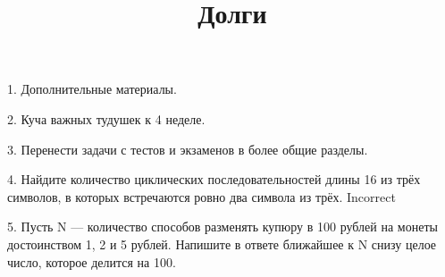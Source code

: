 \documentclass[paper=a4, fontsize=11pt]{scrartcl}
\title{
        \huge Долги \\
}
\date{}
\author{}
\begin{document}
\maketitle

1. Дополнительные материалы.

2. Куча важных тудушек к 4 неделе.

3. Перенести задачи с тестов и экзаменов в более общие разделы.

4. Найдите количество циклических последовательностей длины 16 из трёх символов, в которых встречаются ровно два символа из трёх.
Incorrect

5. Пусть N --- количество способов разменять купюру в 100 рублей на монеты достоинством 1, 2 и 5 рублей. Напишите в ответе ближайшее к N снизу целое число, которое делится на 100.
\end{document}
